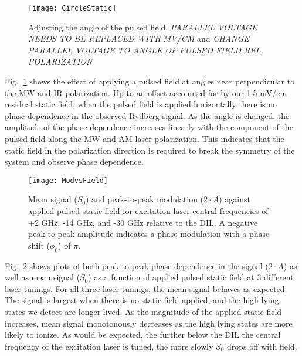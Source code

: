 \documentclass[aps,pra,preprint,groupedaddress]{revtex4-1}
\begin{document}

\begin{figure}
	\texttt{[image: CircleStatic]}
	\caption{Adjusting the angle of the pulsed field. \emph{PARALLEL VOLTAGE NEEDS TO BE REPLACED WITH MV/CM} and \emph{CHANGE PARALLEL VOLTAGE TO ANGLE OF PULSED FIELD REL. POLARIZATION}}
	\label{fig:CircleStatic}
\end{figure}

Fig.~\ref{fig:CircleStatic} shows the effect of applying a pulsed field at angles near perpendicular to the MW and IR polarization. Up to an offset accounted for by our 1.5 mV/cm residual static field, when the pulsed field is applied horizontally there is no phase-dependence in the observed Rydberg signal. As the angle is changed, the amplitude of the phase dependence increases linearly with the component of the pulsed field along the MW and AM laser polarization. This indicates that the static field in the polarization direction is required to break the symmetry of the system and observe phase dependence.

\begin{figure}
	\texttt{[image: ModvsField]}
	\caption{Mean signal ($S_0$) and peak-to-peak modulation ($2\cdot A$) against applied pulsed static field for excitation laser central frequencies of +2 GHz, -14 GHz, and -30 GHz relative to the DIL. A negative peak-to-peak amplitude indicates a phase modulation with a phase shift ($\phi_0$) of $\pi$.}
	\label{fig:ModvsField}
\end{figure}

Fig.~\ref{fig:ModvsField} shows plots of both peak-to-peak phase dependence in the signal ($2\cdot A$) as well as mean signal ($S_0$) as a function of applied pulsed static field at 3 different laser tunings. For all three laser tunings, the mean signal behaves as expected. The signal is largest when there is no static field applied, and the high lying states we detect are longer lived. As the magnitude of the applied static field increases, mean signal monotonously decreases as the high lying states are more likely to ionize. As would be expected, the further below the DIL the central frequency of the excitation laser is tuned, the more slowly $S_0$ drops off with field.
\end{document}
